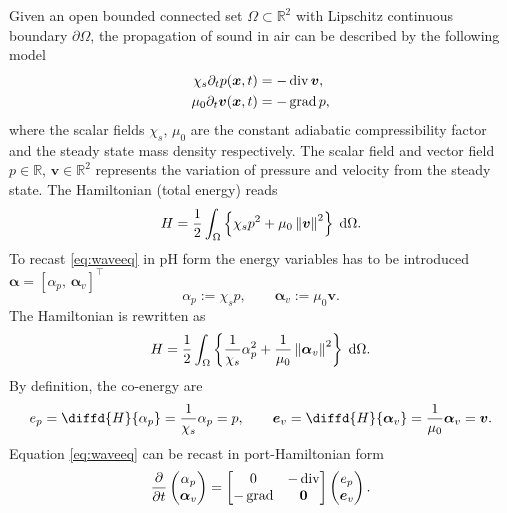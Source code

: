 Given an open bounded connected set $\Omega \subset \mathbb{R}^2$ with Lipschitz continuous boundary $\partial\Omega$, the propagation of sound in air can be described by the following model \cite{trenchant2018}
\begin{equation}\label{eq:waveeq}
\begin{aligned}
\chi_s \partial_{t} p(\bm{x}, t) &=-\operatorname{div} \bm{v}, \\
\mu_0 \partial_{t} \bm{v}(\bm{x}, t) &= -\operatorname*{grad} p, \\
\end{aligned}
\end{equation}
where the scalar fields $\chi_s, \, \mu_0$ are the constant adiabatic compressibility factor and the steady state mass density respectively. The scalar field and vector field $p \in \mathbb{R}, \, \bm{v} \in \mathbb{R}^2$ represents the variation of pressure and velocity from the steady state. The Hamiltonian (total energy) reads
\begin{equation*}
H = \frac{1}{2} \int_{\Omega} \left\{\chi_s p^2 + {\mu_0}\norm{\bm{v}}^2 \right\} \d\Omega.
\end{equation*}
To recast \eqref{eq:waveeq} in pH form the energy variables has to be introduced $\bm{\alpha} = [\alpha_p, \, \bm{\alpha}_v]^\top$
\begin{equation*}
\alpha_p := \chi_s p, \qquad \bm{\alpha}_v := \mu_0 \bm{v}.
\end{equation*} 
The Hamiltonian is rewritten as
\begin{equation*}
H = \frac{1}{2} \int_{\Omega} \left\{\frac{1}{\chi_s}\alpha_p^2 + \frac{1}{\mu_0} \norm{\bm{\alpha}_v}^2 \right\} \d\Omega.
\end{equation*}
By definition, the co-energy are 
\begin{equation*}
e_p = \diffd{H}{\alpha_p} = \frac{1}{\chi_s}\alpha_p = p, \qquad \bm{e}_v = \diffd{H}{\bm{\alpha}_v} = \frac{1}{\mu_0} \bm{\alpha}_v = \bm{v}.
\end{equation*}
Equation \eqref{eq:waveeq} can be recast in port-Hamiltonian form
\begin{equation*}
\diffp{}{t}
\begin{pmatrix}
\alpha_p \\
\bm{\alpha}_v \\
\end{pmatrix} = 
\begin{bmatrix}
0 & -\div \\
-\grad & \bm{0}
\end{bmatrix}
\begin{pmatrix}
e_p \\
\bm{e}_v \\
\end{pmatrix}.
\end{equation*}
